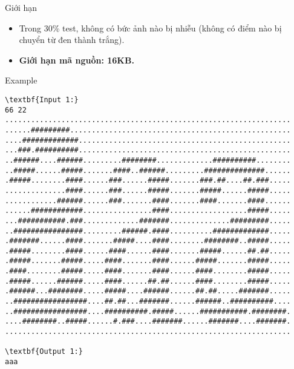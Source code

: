 Giới hạn
\begin{itemize}
	\item 

     Trong 30\% test, không có bức ảnh nào bị nhiễu (không có điểm nào bị chuyển từ đen thành trắng).    
	\item 

\textbf{      Giới hạn mã nguồn: 16KB.     }
\end{itemize}
Example
\begin{verbatim}
\textbf{Input 1:}
66 22
..................................................................
......#########...................................................
....#############.................................................
...###.##########.................................................
..######....######.........########.............##########........
..#####......#####.......####..######.........##############......
.#####........####......###......#####.......###.##....##.###.....
..............####......###......#####.......#####......#####.....
............######......###.......####.......####.......####......
......############................####..................#####.....
...###########.###.............#######..............#########.....
..################.........######.####..........#############.....
.#######......####.......#####....####........########..#####.....
.#####........####......####......####.......#####......##.##.....
.#####.......#####.....####.......####......#####.......#####.....
.####........#####.....####.......####......####........#####.....
.#####......######.....####......##.##......####........#####.....
.######...########.....#####....######......##.##.....#######.....
..#################....##.##...#######......######..##########....
..#################....##########.#####......###########.########.
....########..#####......#.###....#######......#######....#######.
..................................................................

\textbf{Output 1:}
aaa


\end{verbatim}

